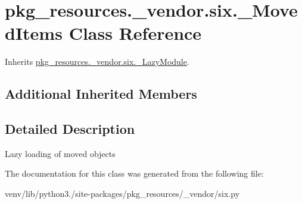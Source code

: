 \hypertarget{classpkg__resources_1_1__vendor_1_1six_1_1___moved_items}{}\section{pkg\+\_\+resources.\+\_\+vendor.\+six.\+\_\+\+Moved\+Items Class Reference}
\label{classpkg__resources_1_1__vendor_1_1six_1_1___moved_items}


Inherits \hyperlink{classpkg__resources_1_1__vendor_1_1six_1_1___lazy_module}{pkg\+\_\+resources.\+\_\+vendor.\+six.\+\_\+\+Lazy\+Module}.

\subsection*{Additional Inherited Members}


\subsection{Detailed Description}
\begin{DoxyVerb}Lazy loading of moved objects\end{DoxyVerb}
 

The documentation for this class was generated from the following file\+:\begin{DoxyCompactItemize}
\item 
venv/lib/python3./site-\/packages/pkg\+\_\+resources/\+\_\+vendor/six.\+py\end{DoxyCompactItemize}
